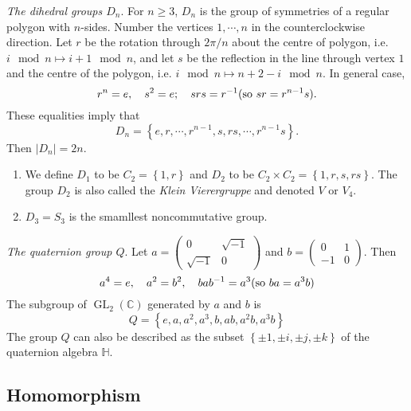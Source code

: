 \begin{example}
  \emph{The dihedral groups \( D_n \)}.
  For \( n \geq 3 \), \( D_n \) is the group of symmetries of a regular polygon with \( n \)-sides.
  Number the vertices \( 1, \cdots, n \) in the counterclockwise direction.
  Let \( r \) be the rotation through \( 2 \pi / n \) about the centre of polygon, i.e. \( i \mod n \mapsto i + 1 \mod n \), and let \( s \) be the reflection in the line through vertex \( 1 \) and the centre of the polygon, i.e. \( i \mod n \mapsto n + 2 - i \mod n \).
  In general case,
  \[
    r^n = e, \quad s^2 = e;\quad srs = r^{-1}(\textmd{so } sr = r^{n - 1}s).
  \]
  These equalities imply that
  \[
    D_n = \left\lbrace e, r, \cdots, r^{n - 1}, s, rs, \cdots, r^{n - 1}s \right\rbrace.
  \]
  Then \( \left\vert D_n \right\vert = 2n \).
\end{example}

\begin{enumerate}
  \item We define \( D_1 \) to be \( C_2 = \left\lbrace 1, r \right\rbrace \) and \( D_2 \) to be \( C_2 \times C_2 = \left\lbrace 1, r, s, rs \right\rbrace \).
    The group \( D_2 \) is also called the \emph{Klein Vierergruppe} and denoted \( V \) or \( V_4 \).
  \item \( D_3 = S_3 \) is the smamllest noncommutative group.
\end{enumerate}

\begin{example}
  \emph{The quaternion group \( Q \)}.
  Let \( a = \begin{pmatrix}
    0 & \sqrt{-1}\\ \sqrt{-1} &0
  \end{pmatrix} \) and \( b = \begin{pmatrix}
    0 & 1\\ -1 & 0
  \end{pmatrix} \).
  Then
  \[
    a^4 = e,\quad a^2 = b^2, \quad b a b^{-1} = a^3(\textmd{so } ba = a^3 b)
  \]
  The subgroup of \( \operatorname{GL}_2(\mathbb{C}) \) generated by \( a \) and \( b \) is
  \[
    Q = \left\lbrace e, a, a^2, a^3, b, ab, a^2b, a^3b \right\rbrace
  \]
  The group \( Q \) can also be described as the subset \( \left\lbrace \pm 1, \pm i, \pm j, \pm k \right\rbrace \) of the quaternion algebra \( \mathbb{H} \).
\end{example}

\subsection{Homomorphism}

